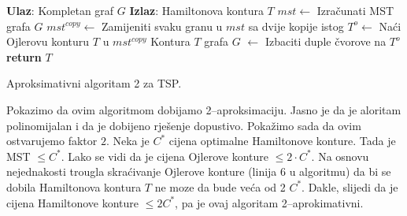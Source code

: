 \documentclass[a4paper, utf8, 11pt, colorlinks]{article}
\begin{document}
\begin{algorithm}[H] 
	\begin{algorithmic}[1]
		\STATE \textbf{Ulaz}: Kompletan graf $G$
		\STATE \textbf{Izlaz}: Hamiltonova kontura $T$   
		\STATE $mst \gets$  Izračunati MST grafa $G$
		\STATE $mst^{copy} \gets$ Zamijeniti svaku granu u $mst$ sa dvije kopije istog
		\STATE $T^o \gets$ Naći Ojlerovu konturu $T$ u $mst^{copy}$
		\STATE Kontura $T$ grafa $G$ $\gets$ Izbaciti duple čvorove na $T^o$   
		\STATE \textbf{return} $T$ 
	\end{algorithmic}
   	\caption{Aproksimativni algoritam 2 za TSP.}
   	\label{alg:tsp-a2}
\end{algorithm}
  Pokazimo da ovim algoritmom dobijamo 2--aproksimaciju. Jasno je da je aloritam polinomijalan i da je dobijeno rješenje dopustivo. Pokažimo sada da ovim ostvarujemo faktor $2$.  
  Neka je $C^*$ cijena optimalne Hamiltonove konture. Tada je MST $\leq C^*$. 
  Lako se vidi da je cijena Ojlerove konture  $\leq 2 \cdot C^*$. Na osnovu nejednakosti trougla skraćivanje Ojlerove konture (linija 6 u algoritmu) da bi se dobila Hamiltonova kontura $T$ ne moze da bude veća od 2 $C^*$. Dakle, slijedi da je cijena Hamiltonove konture $\leq 2 C^*$, pa je ovaj algoritam 2--aprokimativni.
  
\end{document}
